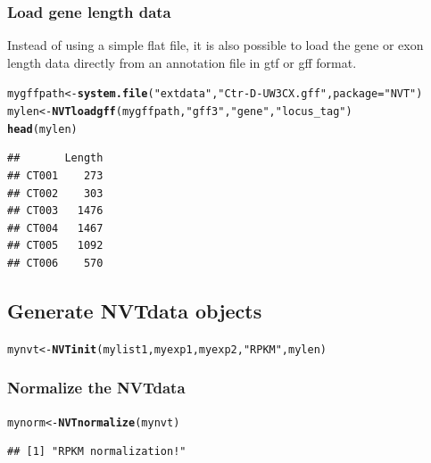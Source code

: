\documentclass[11pt]{article}\usepackage[]{graphicx}\usepackage[]{color}
\makeatletter
\newcommand{\hlstr}[1]{\textcolor[rgb]{0.192,0.494,0.8}{#1}}%
\newcommand{\hlstd}[1]{\textcolor[rgb]{0.345,0.345,0.345}{#1}}%
\newcommand{\hlkwb}[1]{\textcolor[rgb]{0.69,0.353,0.396}{#1}}%
\newcommand{\hlkwc}[1]{\textcolor[rgb]{0.333,0.667,0.333}{#1}}%
\newcommand{\hlkwd}[1]{\textcolor[rgb]{0.737,0.353,0.396}{\textbf{#1}}}%
\newenvironment{kframe}{%
 \def\at@end@of@kframe{}%
 \ifinner\ifhmode%
  \def\at@end@of@kframe{\end{minipage}}%
  \begin{minipage}{\columnwidth}%
 \fi\fi%
 \def\FrameCommand##1{\hskip\@totalleftmargin \hskip-\fboxsep
 \colorbox{shadecolor}{##1}\hskip-\fboxsep
     \hskip-\linewidth \hskip-\@totalleftmargin \hskip\columnwidth}%
 \MakeFramed {\advance\hsize-\width
   \@totalleftmargin\z@ \linewidth\hsize
   \@setminipage}}%
 {\par\unskip\endMakeFramed%
 \at@end@of@kframe}
\newenvironment{knitrout}{}{} %
\makeatother
\begin{document}
\subsubsection{Load gene length data}

Instead of using a simple flat file, it is also possible to load the gene or exon length data directly from an annotation file in gtf or gff format.

\begin{knitrout}
\color{fgcolor}\begin{kframe}
\begin{alltt}
\hlstd{mygffpath}\hlkwb{<-}\hlkwd{system.file}\hlstd{(}\hlstr{"extdata"}\hlstd{,} \hlstr{"Ctr-D-UW3CX.gff"}\hlstd{,} \hlkwc{package} \hlstd{=} \hlstr{"NVT"}\hlstd{)}
\hlstd{mylen} \hlkwb{<-} \hlkwd{NVTloadgff}\hlstd{(mygffpath,}\hlstr{"gff3"}\hlstd{,}\hlstr{"gene"}\hlstd{,}\hlstr{"locus_tag"}\hlstd{)}
\hlkwd{head}\hlstd{(mylen)}
\end{alltt}
\begin{verbatim}
##       Length
## CT001    273
## CT002    303
## CT003   1476
## CT004   1467
## CT005   1092
## CT006    570
\end{verbatim}
\end{kframe}
\end{knitrout}


\subsection{Generate NVTdata objects}

\begin{knitrout}
\color{fgcolor}\begin{kframe}
\begin{alltt}
\hlstd{mynvt} \hlkwb{<-} \hlkwd{NVTinit}\hlstd{(mylist1,myexp1,myexp2,}\hlstr{"RPKM"}\hlstd{,mylen)}
\end{alltt}
\end{kframe}
\end{knitrout}

\subsubsection{Normalize the NVTdata }

\begin{knitrout}
\color{fgcolor}\begin{kframe}
\begin{alltt}
\hlstd{mynorm} \hlkwb{<-} \hlkwd{NVTnormalize}\hlstd{(mynvt)}
\end{alltt}
\begin{verbatim}
## [1] "RPKM normalization!"
\end{verbatim}
\end{kframe}
\end{knitrout}
\end{document}
